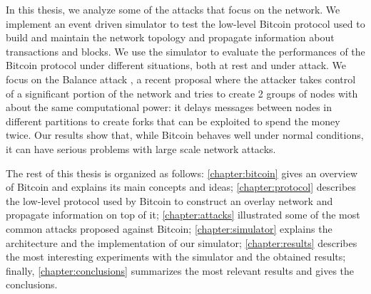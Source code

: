 In this thesis, we analyze some of the attacks that focus on the network.
We implement an event driven simulator to test the low-level Bitcoin protocol used to build and maintain the network topology and propagate information about transactions and blocks.
We use the simulator to evaluate the performances of the Bitcoin protocol under different situations, both at rest and under attack.
We focus on the Balance attack \cite{balance_attack_2017, balance_attack_report_2016}, a recent proposal where the attacker takes control of a significant portion of the network and tries to create \num{2} groups of nodes with about the same computational power:
it delays messages between nodes in different partitions to create forks that can be exploited to spend the money twice.
Our results show that, while Bitcoin behaves well under normal conditions, it can have serious problems with large scale network attacks.

\bigskip
The rest of this thesis is organized as follows:
\cref{chapter:bitcoin} gives an overview of Bitcoin and explains its main concepts and ideas;
\cref{chapter:protocol} describes the low-level protocol used by Bitcoin to construct an overlay network and propagate information on top of it;
\cref{chapter:attacks} illustrated some of the most common attacks proposed against Bitcoin;
\cref{chapter:simulator} explains the architecture and the implementation of our simulator;
\cref{chapter:results} describes the most interesting experiments with the simulator and the obtained results;
finally, \cref{chapter:conclusions} summarizes the most relevant results and gives the conclusions.
